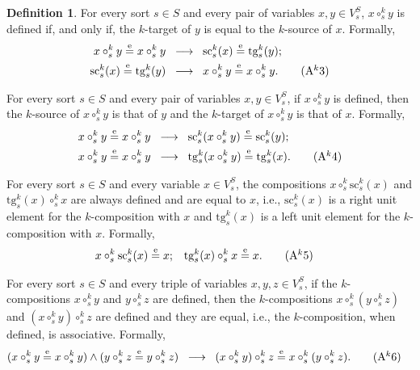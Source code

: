\documentclass[a4paper, reqno]{amsbook}
\newcommand{\eeq}{\overset{\mathrm e}{=}}      %
\newcommand{\src}{\mathrm{sc}}
\newcommand{\tgt}{\mathrm{tg}}
\theoremstyle{plain}
\theoremstyle{definition}
\newtheorem{definition}[theorem]{Definition}
\begin{document}
\begin{definition}
For every sort $s\in S$ and every pair of variables $x,y\in V^{S}_{s}$, $x\circ^{k}_{s} y$ is defined if, and only if, the $k$-target of $y$ is equal to the $k$-source of $x$.
Formally,
\begin{align*}
x\circ^{k}_{s} y\eeq x\circ^{k}_{s} y \;\;
&\longrightarrow \;\;
\src^{k}_{s}(x)\eeq\tgt^{k}_{s}(y);\\
\src^{k}_{s}(x)\eeq\tgt^{k}_{s}(y) \;\;
&\longrightarrow \;\;
x\circ^{k}_{s} y\eeq x\circ^{k}_{s}y.\label{ACatAk3}\tag{A$^{k}$3}
\end{align*}

For every sort $s\in S$ and every pair of variables $x,y\in V^{S}_{s}$, if $x\circ^{k}_{s} y$ is defined, then the $k$-source of $x\circ^{k}_{s}y$ is that of $y$ and the $k$-target of $x\circ^{k}_{s}y$ is that of $x$.
Formally,
\begin{align*}
x\circ^{k}_{s}y\eeq x\circ^{k}_{s}y \;\;
&\longrightarrow \;\;
\src^{k}_{s}(x\circ^{k}_{s}y)\eeq\src^{k}_{s}(y);\\
x\circ^{k}_{s}y\eeq x\circ^{k}_{s}y \;\;
&\longrightarrow \;\;
\tgt^{k}_{s}(x\circ^{k}_{s}y)\eeq\tgt^{k}_{s}(x).\label{ACatAk4}\tag{A$^{k}$4}
\end{align*}

For every sort $s\in S$ and every variable $x\in V^{S}_{s}$, the compositions $x\circ^{k}_{s}\src^{k}_{s}(x)$ and $\tgt^{k}_{s}(x)\circ^{k}_{s}x$ are always defined and are equal to $x$, i.e., $\src^{k}_{s}(x)$ is a right unit element for the $k$-composition with $x$ and $\tgt^{k}_{s}(x)$ is a left unit element for the $k$-composition with $x$.
Formally,
\begin{align*}
x\circ^{k}_{s}\src^{k}_{s}(x)&\eeq x;
&
\tgt^{k}_{s}(x)\circ^{k}_{s}x&\eeq x.\label{ACatAk5}\tag{A$^{k}$5}
\end{align*}

For every sort $s\in S$ and every triple of variables $x, y, z\in V^{S}_{s}$, if the $k$-compositions $x\circ^{k}_{s}y$ and $y\circ^{k}_{s}z$ are defined, then the $k$-compositions $x\circ^{k}_{s}(y\circ^{k}_{s}z)$ and $(x\circ^{k}_{s}y)\circ^{k}_{s}z$ are defined and they are equal, i.e., the $k$-composition, when defined, is associative.
Formally,
\begin{align*}
(x\circ^{k}_{s}y\eeq x\circ^{k}_{s}y)
\wedge
(y\circ^{k}_{s}z\eeq y\circ^{k}_{s}z)\;\;
&\longrightarrow \;\;
(x\circ^{k}_{s}y)\circ^{k}_{s}z\eeq x\circ^{k}_{s}(y\circ^{k}_{s}z).\label{ACatAk6}\tag{A$^{k}$6}
\end{align*}


\end{definition}
\end{document}
